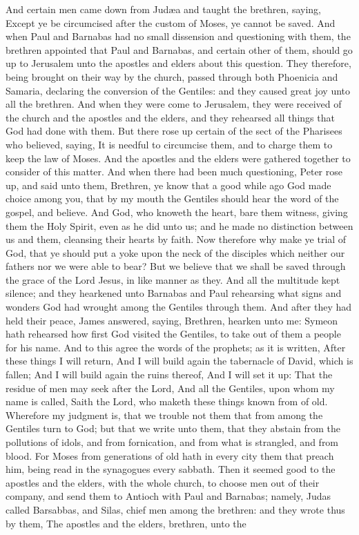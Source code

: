 And certain men came down from Judæa and taught the brethren, saying, Except ye be circumcised after the custom of Moses, ye cannot be saved. And when Paul and Barnabas had no small dissension and questioning with them, the brethren appointed that Paul and Barnabas, and certain other of them, should go up to Jerusalem unto the apostles and elders about this question. They therefore, being brought on their way by the church, passed through both Phoenicia and Samaria, declaring the conversion of the Gentiles: and they caused great joy unto all the brethren. And when they were come to Jerusalem, they were received of the church and the apostles and the elders, and they rehearsed all things that God had done with them. But there rose up certain of the sect of the Pharisees who believed, saying, It is needful to circumcise them, and to charge them to keep the law of Moses.  And the apostles and the elders were gathered together to consider of this matter. And when there had been much questioning, Peter rose up, and said unto them, Brethren, ye know that a good while ago God made choice among you, that by my mouth the Gentiles should hear the word of the gospel, and believe. And God, who knoweth the heart, bare them witness, giving them the Holy Spirit, even as he did unto us; and he made no distinction between us and them, cleansing their hearts by faith. Now therefore why make ye trial of God, that ye should put a yoke upon the neck of the disciples which neither our fathers nor we were able to bear? But we believe that we shall be saved through the grace of the Lord Jesus, in like manner as they.  And all the multitude kept silence; and they hearkened unto Barnabas and Paul rehearsing what signs and wonders God had wrought among the Gentiles through them. And after they had held their peace, James answered, saying, Brethren, hearken unto me: Symeon hath rehearsed how first God visited the Gentiles, to take out of them a people for his name. And to this agree the words of the prophets; as it is written,  After these things I will return, And I will build again the tabernacle of David, which is fallen; And I will build again the ruins thereof, And I will set it up:  That the residue of men may seek after the Lord, And all the Gentiles, upon whom my name is called,  Saith the Lord, who maketh these things known from of old.  Wherefore my judgment is, that we trouble not them that from among the Gentiles turn to God; but that we write unto them, that they abstain from the pollutions of idols, and from fornication, and from what is strangled, and from blood. For Moses from generations of old hath in every city them that preach him, being read in the synagogues every sabbath.  Then it seemed good to the apostles and the elders, with the whole church, to choose men out of their company, and send them to Antioch with Paul and Barnabas; namely, Judas called Barsabbas, and Silas, chief men among the brethren: and they wrote thus by them, The apostles and the elders, brethren, unto the 